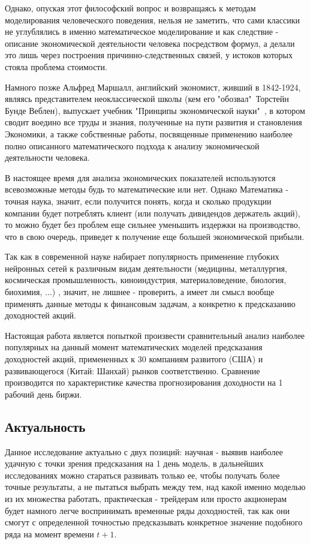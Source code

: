 	Однако, опуская этот философский вопрос и возвращаясь к методам моделирования человеческого поведения, нельзя не заметить, что сами классики не углублялись в именно математическое моделирование и как следствие - описание экономической деятельности человека посредством формул, а делали это лишь через построения причинно-следственных связей, у истоков которых стояла проблема стоимости. 
	
	Намного позже Альфред Маршалл, английский экономист, живший в 1842-1924, являясь представителем неоклассической школы (кем его "обозвал"\ Торстейн Бунде Веблен), выпускает учебник "Принципы экономической науки"\ \cite{alfred_marshall}, в котором сводит воедино все труды и знания, полученные на пути развития и становления Экономики, а также собственные работы, посвященные применению наиболее полно описанного математического подхода к анализу экономической деятельности человека. 
	
	В настоящее время для анализа экономических показателей используются всевозможные методы будь то математические или нет. Однако Математика - точная наука, значит, если получится понять, когда и сколько продукции компании будет потреблять клиент (или получать дивидендов держатель акций), то можно будет без проблем еще сильнее уменьшить издержки на производство, что в свою очередь, приведет к получение еще большей экономической прибыли. 
	
	Так как в современной науке набирает популярность применение глубоких нейронных сетей к различным видам деятельности (медицины, металлургия, космическая промышленность, киноиндустрия, материаловедение, биология, биохимия, ...) \cite{nn_all_over_us}, значит, не лишнее - проверить, а имеет ли смысл вообще применять данные методы к финансовым задачам, а конкретно к предсказанию доходностей акций. 
	
	Настоящая работа является попыткой произвести сравнительный анализ наиболее популярных на данный момент математических моделей предсказания доходностей акций, примененных к 30 компаниям развитого (США) и развивающегося (Китай: Шанхай) рынков соответственно. Сравнение производится по характеристике качества прогнозирования доходности на 1 рабочий день биржи.
	\subsection{Актуальность}
		Данное исследование актуально с двух позиций: научная - выявив наиболее удачную с точки зрения предсказания на 1 день модель, в дальнейших исследованиях можно стараться развивать только ее, чтобы получать более точные результаты, а не пытаться выбрать между тем, над какой именно моделью из их множества работать, практическая - трейдерам или просто акционерам будет намного легче воспринимать временные ряды доходностей, так как они смогут с определенной точностью предсказывать конкретное значение подобного ряда на момент времени $t + 1$.
